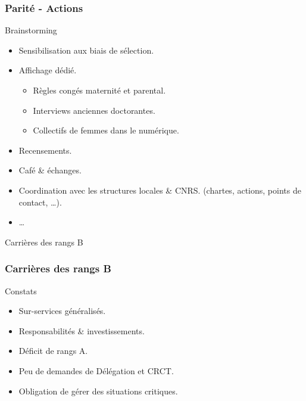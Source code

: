 \documentclass[]{beamer}
\begin{document}

\begin{frame}
  \frametitle{Parité - Actions}

  \begin{block}{Brainstorming}
    \begin{itemize}
      \item Sensibilisation aux biais de sélection.
      \item Affichage dédié.
        \begin{itemize}
          \item Règles congés maternité et parental.
          \item Interviews anciennes doctorantes.
          \item Collectifs de femmes dans le numérique.
        \end{itemize}
      \item Recensements.
      \item Café \& échanges.
      \item Coordination avec les structures locales \& CNRS. 
      (chartes, actions, points de contact, \dots).
      \item \dots
    \end{itemize}
  \end{block}

\end{frame}


\begin{frame}[label=points, standout]{}
  Carrières des rangs B
\end{frame}


\begin{frame}
  \frametitle{Carrières des rangs B}

  \begin{block}{Constats}
    \begin{itemize}
      \item Sur-services généralisés.
      \item Responsabilités \& investissements.
      \item Déficit de rangs A.
      \item Peu de demandes de Délégation et CRCT.
      \item Obligation de gérer des situations critiques.
    \end{itemize}
  \end{block}

\end{frame}
\end{document}
